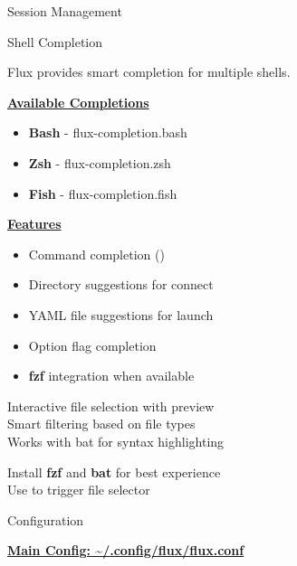 \documentclass[10pt,a4paper]{article}
\begin{document}
\begin{multicols}{3}
\begin{textbox}{Session Management}
\end{textbox}

\begin{textbox}{Shell Completion}

Flux provides smart completion for multiple shells.

\underline{\textbf{Available Completions}}
\begin{itemize}
    \item \textbf{Bash} - flux-completion.bash
    \item \textbf{Zsh} - flux-completion.zsh  
    \item \textbf{Fish} - flux-completion.fish
\end{itemize}

\underline{\textbf{Features}}
\begin{itemize}
    \item Command completion ()
    \item Directory suggestions for connect
    \item YAML file suggestions for launch
    \item Option flag completion
    \item \textbf{fzf} integration when available
\end{itemize}


Interactive file selection with preview\\

Smart filtering based on file types\\

Works with bat for syntax highlighting\\


Install \textbf{fzf} and \textbf{bat} for best experience\\

Use   to trigger file selector\\

\end{textbox}

\begin{textbox}{Configuration}

\underline{\textbf{Main Config: \textasciitilde/.config/flux/flux.conf}}




\end{textbox}
\end{multicols}
\end{document}
